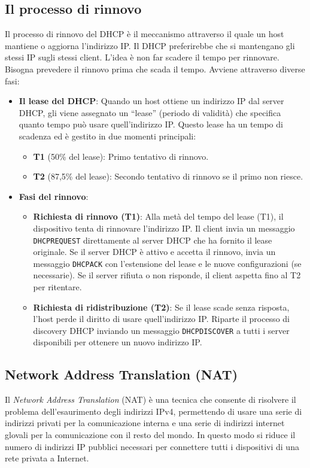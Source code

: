 \documentclass[12pt]{report}
\begin{document}
\subsection{Il processo di rinnovo}
Il processo di rinnovo del DHCP è il meccanismo attraverso il quale un host mantiene o aggiorna l'indirizzo IP. Il DHCP preferirebbe che si mantengano gli stessi IP sugli stessi client. L’idea è non far scadere il tempo per rinnovare. Bisogna prevedere il rinnovo prima che scada il tempo.  
Avviene attraverso diverse fasi:
\begin{itemize}
    \item \textbf{Il lease del DHCP}: Quando un host ottiene un indirizzo IP dal server DHCP, gli viene assegnato un “lease” (periodo di validità) che specifica quanto tempo può usare quell’indirizzo IP. Questo lease ha un tempo di scadenza ed è gestito in due momenti principali:
    \begin{itemize}
        \item \textbf{T1} (50\% del lease): Primo tentativo di rinnovo.
        \item \textbf{T2} (87,5\% del lease): Secondo tentativo di rinnovo se il primo non riesce.
    \end{itemize}

    \item \textbf{Fasi del rinnovo}:
    \begin{itemize}
        \item \textbf{Richiesta di rinnovo (T1)}: Alla metà del tempo del lease (T1), il dispositivo tenta di rinnovare l’indirizzo IP. Il client invia un messaggio \texttt{DHCPREQUEST} direttamente al server DHCP che ha fornito il lease originale. Se il server DHCP è attivo e accetta il rinnovo, invia un messaggio \texttt{DHCPACK} con l’estensione del lease e le nuove configurazioni (se necessarie). Se il server rifiuta o non risponde, il client aspetta fino al T2 per ritentare.
        \item \textbf{Richiesta di ridistribuzione (T2)}: Se il lease scade senza risposta, l’host perde il diritto di usare quell’indirizzo IP. Riparte il processo di discovery DHCP inviando un messaggio \texttt{DHCPDISCOVER} a tutti i server disponibili per ottenere un nuovo indirizzo IP.
    \end{itemize}
\end{itemize}

\subsection{Network Address Translation (NAT)}
Il \textit{Network Address Translation} (NAT) è una tecnica che consente di risolvere il problema dell'esaurimento degli indirizzi IPv4, permettendo di usare una serie di indirizzi privati per la comunicazione interna e una serie di indirizzi internet glovali per la comunicazione con il resto del mondo. In questo modo si riduce il numero di indirizzi IP pubblici necessari per connettere tutti i dispositivi di una rete privata a Internet.
\end{document}
